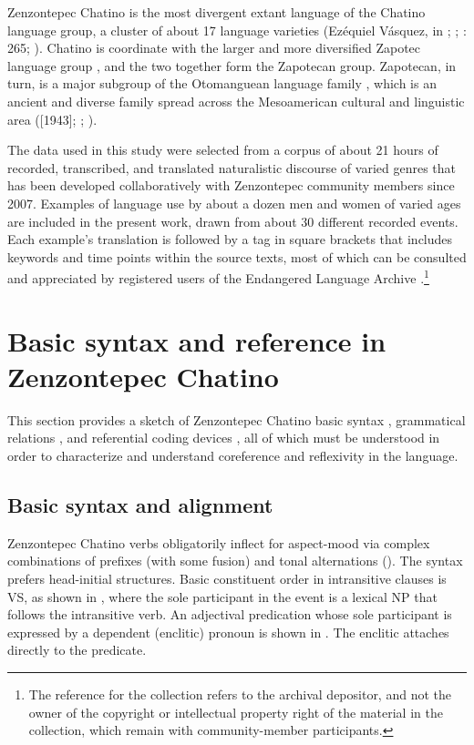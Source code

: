\documentclass[output=paper]{../langscibook}
\begin{document}
Zenzontepec Chatino is the most divergent extant language of the Chatino language group, a cluster of about 17 language varieties (Ezéquiel Vásquez, in \citealt{Boas1913}; \citealt{Campbell2013Diversification}; \citealt{CruzWoodbury2014}: 265; \citealt{Sullivant2016}). Chatino is coordinate with the larger and more diversified Zapotec language group \citep{Mechling1912}, and the two together form the Zapotecan group. Zapotecan, in turn, is a major subgroup of the Otomanguean language family \citep{Rensch1976}, which is an ancient and diverse family spread across the Mesoamerican cultural and linguistic area (\citealt{Kirchhoff1967}[1943]; \citealt{CampbellEtAl1986}; \citealt{SmithStark1988}).



The data used in this study were selected from a corpus of about 21 hours of recorded, transcribed, and translated naturalistic discourse of varied genres that has been developed collaboratively with Zenzontepec community members since 2007. Examples of language use by about a dozen men and women of varied ages are included in the present work, drawn from about 30 different recorded events. Each example’s translation is followed by a tag in square brackets that includes keywords and time points within the source texts, most of which can be consulted and appreciated by registered users of the Endangered Language Archive \citep{Campbell2013Zenzontepec}.\footnote{The reference for the collection refers to the archival depositor, and not the owner of the copyright or intellectual property right of the material in the collection, which remain with community-member participants.}


\section{Basic syntax and reference in Zenzontepec Chatino}
\label{sec:campbell:3}
This section provides a sketch of Zenzontepec Chatino basic syntax , grammatical relations , and referential coding devices , all of which must be understood in order to characterize and understand coreference and reflexivity in the language.


\subsection{Basic syntax and alignment}
\label{sec:campbell:3.1}

Zenzontepec Chatino verbs obligatorily inflect for aspect-mood via complex combinations of prefixes (with some fusion) and tonal alternations (\citealt{Campbell2016,Campbell2019}). The syntax prefers head-initial structures. Basic constituent order in intransitive clauses is VS, as shown in , where the sole participant in the event is a lexical NP that follows the intransitive verb. An adjectival predication whose sole participant is expressed by a dependent (enclitic) pronoun is shown in . The enclitic attaches directly to the predicate.
\end{document}
